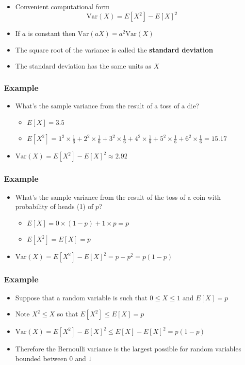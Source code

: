 \documentclass[aspectratio=169]{beamer}
\newcommand{\Var}{\mathrm{Var}}
\begin{document}
\begin{frame}
  \begin{itemize}
  \item Convenient computational form
    $$
    \Var(X) = E[X^2] - E[X]^2
    $$
  \item If $a$ is constant then $\Var(aX) = a^2 \Var(X)$
  \item The square root of the variance is called the {\bf standard deviation}
  \item The standard deviation has the same units as $X$
  \end{itemize}
\end{frame}


\begin{frame}\frametitle{Example}
  \begin{itemize}
  \item   What's the sample variance from the result of a toss of a die? 
    \begin{itemize}
    \item $E[X] = 3.5$ 
    \item $E[X^2] = 1 ^ 2 \times \frac{1}{6} + 2 ^ 2 \times \frac{1}{6} +
  3 ^ 2 \times \frac{1}{6} + 4 ^ 2 \times \frac{1}{6} +
  5 ^ 2 \times \frac{1}{6} + 6 ^ 2 \times \frac{1}{6} = 15.17$ 
    \end{itemize}
  \item $\Var(X) = E[X^2] - E[X]^2 \approx 2.92$
 \end{itemize}
\end{frame}

\begin{frame}\frametitle{Example}
  \begin{itemize}
  \item  What's the sample variance from the result of the toss of a coin
    with probability of heads (1) of $p$? 
    \begin{itemize}
    \item   $E[X] = 0 \times (1 - p) + 1 \times p = p$
    \item $E[X^2] = E[X] = p$ 
    \end{itemize}
  \item $\Var(X) = E[X^2] - E[X]^2 = p - p^2 = p(1 - p)$
  \end{itemize}
\end{frame}


\begin{frame}\frametitle{Example} 
  \begin{itemize}
  \item Suppose that a random variable is such that $0 \leq X \leq 1$ and $E[X] = p$
  \item Note $X^2 \leq X$ so that $E[X^2] \leq E[X] = p$
  \item $\Var(X) = E[X^2] - E[X]^2 \leq E[X] - E[X]^2 = p(1-p)$
  \item Therefore the Bernoulli variance is the largest possible for random variables bounded between $0$ and $1$
  \end{itemize}
\end{frame}
\end{document}

